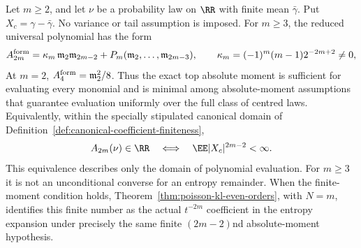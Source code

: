 \begin{proposition}%
\label{thm:sharp-moment-equivalence-hierarchy}
Let \(m\ge2\), and let \(\nu\) be a probability law on \(\RR\) with finite
mean \(\bar\gamma\).  Put \(X_c=\gamma-\bar\gamma\).  No variance or tail
assumption is imposed.  For \(m\ge3\), the reduced universal polynomial has
the form
\begin{equation}\label{eq:sharp-moment-equivalence-top-layer}
A_{2m}^{\rm form}
=\kappa_m\,\mathfrak m_2\mathfrak m_{2m-2}
 +P_m(\mathfrak m_2,\ldots,\mathfrak m_{2m-3}),
\qquad
\kappa_m=(-1)^m(m-1)2^{-2m+2}\ne0,
\end{equation}
At \(m=2\), \(A_4^{\rm form}=\mathfrak m_2^2/8\).  Thus the exact top absolute moment
is sufficient for evaluating every monomial and is minimal among
absolute-moment assumptions that guarantee evaluation uniformly over the full
class of centred laws.  Equivalently, within the specially stipulated
canonical domain of Definition~\ref{def:canonical-coefficient-finiteness},
\begin{equation}\label{eq:sharp-moment-equivalence-hierarchy}
 A_{2m}(\nu)\in\RR
 \quad\Longleftrightarrow\quad
 \EE|X_c|^{2m-2}<\infty .
\end{equation}
This equivalence describes only the domain of polynomial evaluation.  For
\(m\ge3\) it is not an unconditional converse for an entropy remainder.  When the
finite-moment condition holds, Theorem~\ref{thm:poisson-kl-even-orders}, with
\(N=m\), identifies this finite number as the actual \(t^{-2m}\)
coefficient in the entropy expansion under precisely the same finite
\((2m-2)\)nd absolute-moment hypothesis.
\end{proposition}

